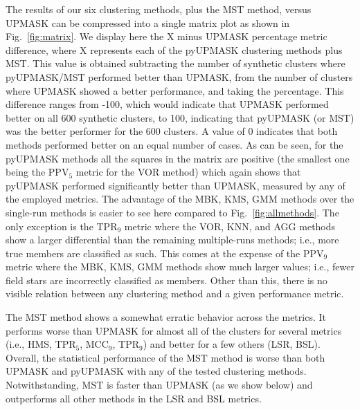 \documentclass{aa}
\begin{document}
 The results of our six clustering methods, plus the MST method, versus UPMASK
 can be compressed into a single matrix plot as shown in
 Fig.~\ref{fig:matrix}. We display here the X minus UPMASK percentage
 metric difference, where X represents each of the pyUPMASK clustering methods
 plus MST. This value is obtained subtracting the number of synthetic clusters
 where pyUPMASK/MST performed better than UPMASK, from the number of clusters
 where UPMASK showed a better performance, and taking the percentage.
 This difference ranges from -100, which would indicate that UPMASK performed
 better on all 600 synthetic clusters, to 100, indicating that pyUPMASK (or
 MST) was the better performer for the 600 clusters. A value of 0 indicates
 that both methods performed better on an equal number of cases.
 As can be seen, for the pyUPMASK methods all the squares in the matrix are
 positive (the smallest one being the PPV$_5$ metric for the VOR method) which
 again shows that pyUPMASK performed significantly better than UPMASK, measured
 by any of the employed metrics.
 The advantage of the MBK, KMS, GMM methods over the single-run methods is
 easier to see here compared to Fig.~\ref{fig:allmethods}. The only exception
 is the TPR$_9$ metric where the VOR, KNN, and AGG methods show a larger
 differential than the remaining multiple-runs methods; i.e., more true members
 are classified as such. This comes at the expense of the PPV$_9$ metric where
 the MBK, KMS, GMM methods show much larger values; i.e., fewer field stars are
 incorrectly classified as members. Other than this, there is no visible
 relation between any clustering method and a given performance metric.

 The MST method shows a somewhat erratic behavior across the metrics. It
 performs worse than UPMASK for almost all of the clusters for several metrics
 (i.e., HMS, TPR$_5$, MCC$_9$, TPR$_9$) and better for a few others (LSR, BSL).
 Overall, the statistical performance of the MST method is worse than both
 UPMASK and pyUPMASK with any of the tested clustering methods.
 Notwithstanding, MST is faster than UPMASK (as we show below)
 and outperforms all other methods in the LSR and BSL metrics.\\
\end{document}
